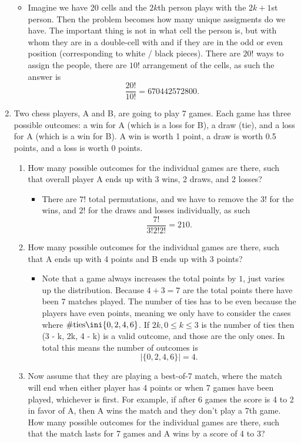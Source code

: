 \documentclass{article}
\begin{document}
\begin{enumerate}
\begin{itemize}
			\item Imagine we have 20 cells and the $2k$th person plays with the $2k + 1$st person. Then the problem becomes how many unique assigments do we have. The important thing is not in what cell the person is, but with whom they are in a double-cell with and if they are in the odd or even position (corresponding to white / black pieces). There are $20!$ ways to assign the people, there are $10!$ arrangement of the cells, as such the answer is
			$$
			\frac{20!}{10!} = 670442572800.
			$$
		\end{itemize}
	\item Two chess players, A and B, are going to play 7 games. Each game has three possible outcomes: a win for A (which is a loss for B), a draw (tie), and a loss for A (which is a win for B). A win is worth 1 point, a draw is worth 0.5 points, and a loss is worth 0 points.
		\begin{enumerate}
			\item How many possible outcomes for the individual games are there, such that overall player A ends up with 3 wins, 2 draws, and 2 losses?
				\begin{itemize}
					\item There are $7!$ total permutations, and we have to remove the $3!$ for the wins, and $2!$ for the draws and losses individually, as such
					$$
					\frac{7!}{3!2!2!} = 210.
					$$
				\end{itemize}
			\item How many possible outcomes for the individual games are there, such that A ends up with 4 points and B ends up with 3 points?
				\begin{itemize}
					\item Note that a game always increases the total points by $1$, just varies up the distribution. Because $4 + 3 = 7$ are the total points there have been $7$ matches played. The number of ties has to be even because the players have even points, meaning we only have to consider the cases where $\#\text{ties} \ini \{0, 2, 4, 6\}$. If $2k, 0 \leq k \leq 3$ is the number of ties then (3 - k, 2k, 4 - k) is a valid outcome, and those are the only ones. In total this means the number of outcomes is
					$$
					|\{0, 2, 4, 6\}| = 4.
					$$
				\end{itemize}
			\item Now assume that they are playing a best-of-7 match, where the match will end when either player has 4 points or when 7 games have been played, whichever is first. For example, if after 6 games the score is 4 to 2 in favor of A, then A wins the match and they don’t play a 7th game. How many possible outcomes for the individual games are there, such that the match lasts for 7 games and A wins by a score of 4 to 3?

\end{enumerate}
\end{enumerate}
\end{document}
